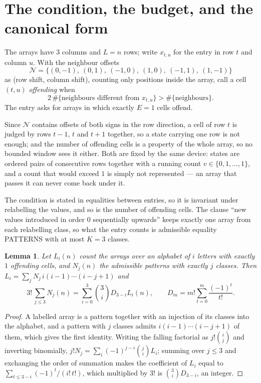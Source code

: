\documentclass[11pt,a4paper]{article}
\theoremstyle{plain}
\newtheorem{lemma}[theorem]{Lemma}
\theoremstyle{definition}
\begin{document}
\section{The condition, the budget, and the canonical form}

The arrays have $3$ columns and $L=n$ rows; write $x_{t,u}$ for the entry in
row $t$ and column $u$. With the neighbour offsets
\[
\mathcal N=\{(0,-1),\ (0,1),\ (-1,0),\ (1,0),\ (-1,1),\ (1,-1)\}
\]
as (row shift, column shift), counting only positions inside the array, call a cell
$(t,u)$ \emph{offending} when
\[
2\,\#\{\text{neighbours different from }x_{t,u}\}>\#\{\text{neighbours}\} .
\]
The entry asks for arrays in which exactly $E=1$ cells offend.

Since $\mathcal N$ contains offsets of both signs in the row direction, a cell of row
$t$ is judged by rows $t-1$, $t$ and $t+1$ together, so a state carrying one row is not
enough; and the number of offending cells is a property of the whole array, so no bounded
window sees it either. Both are fixed by the same device: states are ordered pairs of
consecutive rows together with a running count $v\in\{0,1,\dots,1\}$, and a count that
would exceed $1$ is simply not represented --- an array that passes it can never come back
under it.

The condition is stated in equalities between entries, so it is invariant under relabelling
the values, and so is the number of offending cells. The clause ``new values introduced in
order $0$ sequentially upwards'' keeps exactly one array from each relabelling class, so what
the entry counts is admissible equality PATTERNS with at most $K=3$ classes.

\begin{lemma}\label{lem:inv}
Let $L_i(n)$ count the arrays over an alphabet of $i$ letters with exactly $1$ offending
cells, and $N_j(n)$ the admissible patterns with exactly $j$ classes. Then
$L_i=\sum_j N_j\,i(i-1)\cdots(i-j+1)$ and
\[
3!\,\sum_{j\le3}N_j(n)=\sum_{i=0}^{3}\binom{3}{i}D_{3-i}L_i(n),
\qquad D_m=m!\sum_{t=0}^{m}\frac{(-1)^t}{t!} .
\]
\end{lemma}

\begin{proof}
A labelled array is a pattern together with an injection of its classes into the alphabet,
and a pattern with $j$ classes admits $i(i-1)\cdots(i-j+1)$ of them, which gives the first
identity. Writing the falling factorial as $j!\binom{i}{j}$ and inverting binomially,
$j!N_j=\sum_i(-1)^{j-i}\binom{j}{i}L_i$; summing over $j\le3$ and exchanging the
order of summation makes the coefficient of $L_i$ equal to
$\sum_{t\le3-i}(-1)^t/(i!\,t!)$, which multiplied by $3!$ is
$\binom{3}{i}D_{3-i}$, an integer.
\end{proof}
\end{document}
